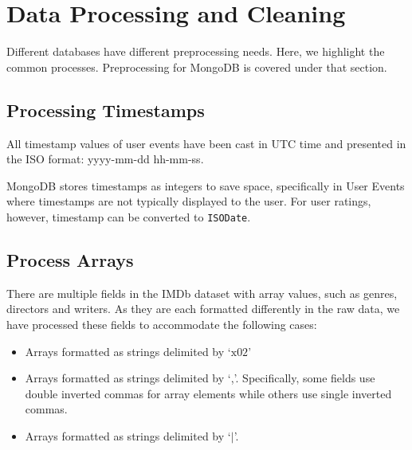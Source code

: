\documentclass[10pt,titlepage]{article}
\begin{document}


\newpage
\section{Data Processing and Cleaning}
Different databases have different preprocessing needs. Here, we highlight the common processes. Preprocessing for
MongoDB is covered under that section.

\subsection{Processing Timestamps}
All timestamp values of user events have been cast in UTC time and presented in the ISO format: yyyy-mm-dd hh-mm-ss.

MongoDB stores timestamps as integers to save space, specifically in User Events where timestamps are not typically
displayed to the user. For user ratings, however, timestamp can be converted to \texttt{ISODate}.

\subsection{Process Arrays}
There are multiple fields in the IMDb dataset with array values, such as genres, directors and writers. As they are each
formatted differently in the raw data, we have processed these fields to accommodate the following cases:

\begin{itemize}
  \item Arrays formatted as strings delimited by `$\mathrm{x}02$'

  \item Arrays formatted as strings delimited by `,'. Specifically, some fields use double inverted commas for array
      elements while others use single inverted commas.

  \item Arrays formatted as strings delimited by `$\mid$'.
\end{itemize}
\end{document}
